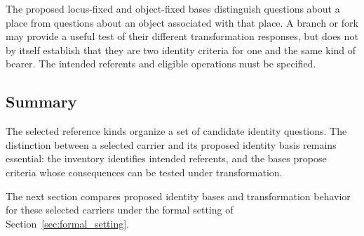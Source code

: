 The proposed locus-fixed and object-fixed bases distinguish questions
about a place from questions about an object associated with that
place.
A branch or fork may provide a useful test of their different
transformation responses, but does not by itself establish that they
are two identity criteria for one and the same kind of bearer.
The intended referents and eligible operations must be specified.

\subsection{Summary}
\label{subsec:inventory_summary}

The selected reference kinds organize a set of candidate identity
questions.
The distinction between a selected carrier and its proposed identity
basis remains essential: the inventory identifies intended referents,
and the bases propose criteria whose consequences can be tested
under transformation.

The next section compares proposed identity bases and transformation
behavior for these selected carriers under the formal setting of
Section~\ref{sec:formal_setting}.
